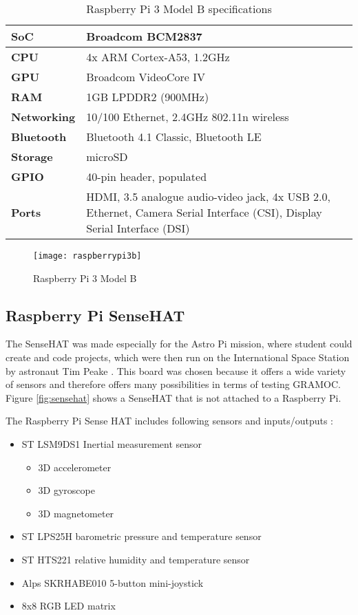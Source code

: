 \begin{table}[h]
    \centering
    \begin{tabularx}{\linewidth}{| l | X |}
    \hline
    \textbf{SoC} & Broadcom BCM2837 \\ \hline
    \textbf{CPU} & 4x ARM Cortex-A53, 1.2GHz \\ \hline
    \textbf{GPU} & Broadcom VideoCore IV \\ \hline
    \textbf{RAM} & 1GB LPDDR2 (900MHz) \\ \hline
    \textbf{Networking} & 10/100 Ethernet, 2.4GHz 802.11n wireless \\ \hline
    \textbf{Bluetooth} & Bluetooth 4.1 Classic, Bluetooth LE \\ \hline
    \textbf{Storage} & microSD \\ \hline
    \textbf{GPIO} & 40-pin header, populated \\ \hline
    \textbf{Ports} & HDMI, 3.5 analogue audio-video jack, 4x USB 2.0, Ethernet, Camera Serial Interface (CSI), Display Serial Interface (DSI) \\ \hline
    \end{tabularx}
    \caption{Raspberry Pi 3 Model B specifications}
    \label{tab:raspispec}
\end{table}

\begin{figure}[H]
	\centering
	\texttt{[image: raspberrypi3b]}
	\caption{Raspberry Pi 3 Model B \cite{img:raspi}}
	\label{fig:raspberrypi3b}
\end{figure}

\subsection{Raspberry Pi SenseHAT}

The SenseHAT was made especially for the Astro Pi mission, where student could create and code projects, which were then run on the International Space Station by astronaut Tim Peake \cite{AstroPiMission}. This board was chosen because it offers a wide variety of sensors and therefore offers many possibilities in terms of testing GRAMOC. Figure \vref{fig:sensehat} shows a SenseHAT that is not attached to a Raspberry Pi.

The Raspberry Pi Sense HAT includes following sensors and inputs/outputs \cite{SenseHAT}:

\begin{itemize}
	\item ST LSM9DS1 Inertial measurement sensor
		\begin{itemize}
			\item 3D accelerometer
			\item 3D gyroscope
			\item 3D magnetometer
		\end{itemize}
	\item ST LPS25H barometric pressure and temperature sensor
	\item ST HTS221 relative humidity and temperature sensor
	\item Alps SKRHABE010 5-button mini-joystick
	\item 8x8 RGB LED matrix
\end{itemize}

